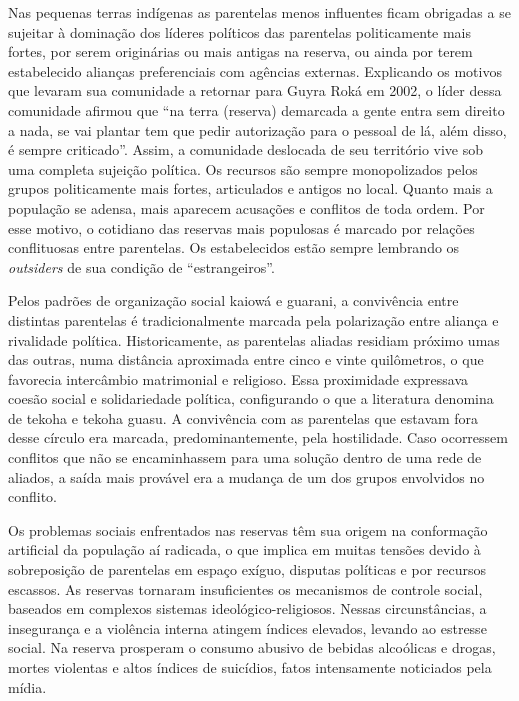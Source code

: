 Nas pequenas terras indígenas as parentelas menos influentes ficam
obrigadas a se sujeitar à dominação dos líderes políticos das
parentelas politicamente mais fortes, por serem originárias ou mais
antigas na reserva, ou ainda por terem estabelecido alianças
preferenciais com agências externas. Explicando os motivos que levaram
sua comunidade a retornar para Guyra Roká em 2002, o líder dessa
comunidade afirmou que ``na terra (reserva) demarcada a gente entra sem
direito a nada, se vai plantar tem que pedir autorização para o pessoal
de lá, além disso, é sempre criticado''. Assim, a comunidade deslocada
de seu território vive sob uma completa sujeição política. Os recursos
são sempre monopolizados pelos grupos politicamente mais fortes,
articulados e antigos no local. Quanto mais a população se adensa, mais
aparecem acusações e conflitos de toda ordem. Por esse motivo, o
cotidiano das reservas mais populosas é marcado por relações
conflituosas entre parentelas. Os estabelecidos estão sempre lembrando
os \emph{outsiders} de sua condição de ``estrangeiros''. 

Pelos padrões de organização social kaiowá e guarani, a convivência
entre distintas parentelas é tradicionalmente marcada pela polarização
entre aliança e rivalidade política. Historicamente, as parentelas
aliadas residiam próximo umas das outras, numa distância aproximada
entre cinco e vinte quilômetros, o que favorecia intercâmbio
matrimonial e religioso. Essa proximidade expressava coesão social e
solidariedade política, configurando o que a literatura denomina de
tekoha e tekoha guasu. A convivência com as parentelas que estavam fora
desse círculo era marcada, predominantemente, pela hostilidade. Caso
ocorressem conflitos que não se encaminhassem para uma solução dentro
de uma rede de aliados, a saída mais provável era a mudança de um dos
grupos envolvidos no conflito.

Os problemas sociais enfrentados nas reservas têm sua origem na
conformação artificial da população aí radicada, o que implica em
muitas tensões devido à sobreposição de parentelas em espaço exíguo,
disputas políticas e por recursos escassos. As reservas tornaram
insuficientes os mecanismos de controle social, baseados em complexos
sistemas ideológico-religiosos. Nessas circunstâncias, a insegurança e
a violência interna atingem índices elevados, levando ao estresse
social. Na reserva prosperam o consumo abusivo de bebidas alcoólicas e
drogas, mortes violentas e altos índices de suicídios, fatos
intensamente noticiados pela mídia.

